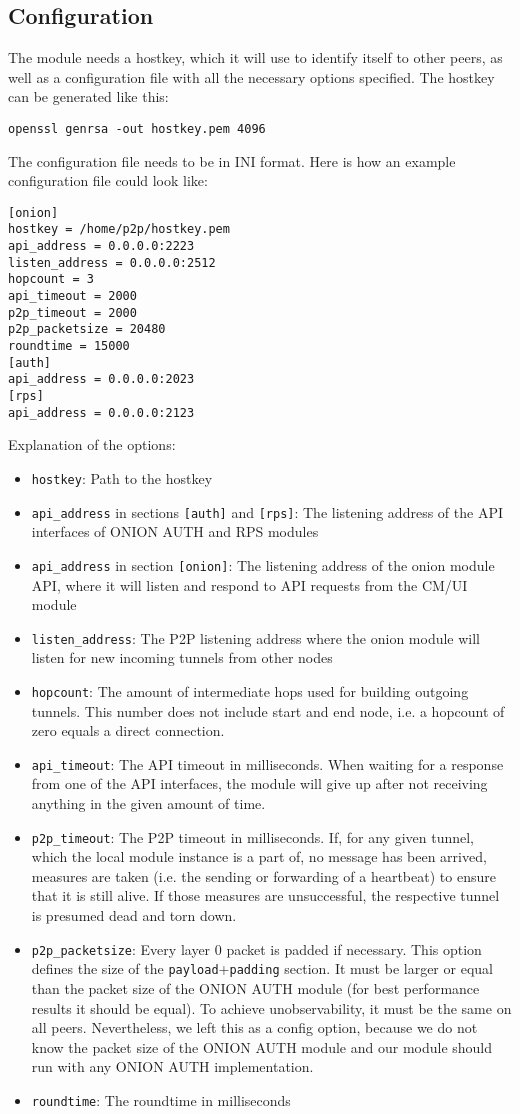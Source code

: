 \documentclass{article}
\begin{document}
\subsection{Configuration}
The module needs a hostkey, which it will use to identify itself to other peers, as well as a configuration file with all the necessary options specified. The hostkey can be generated like this:
\begin{lstlisting}
openssl genrsa -out hostkey.pem 4096
\end{lstlisting} 
The configuration file needs to be in INI format. Here is how an example configuration file could look like:
\begin{lstlisting}
[onion]
hostkey = /home/p2p/hostkey.pem
api_address = 0.0.0.0:2223
listen_address = 0.0.0.0:2512
hopcount = 3
api_timeout = 2000
p2p_timeout = 2000
p2p_packetsize = 20480
roundtime = 15000
[auth]
api_address = 0.0.0.0:2023
[rps]
api_address = 0.0.0.0:2123
\end{lstlisting}
Explanation of the options:
\begin{itemize}
\item \texttt{hostkey}: Path to the hostkey
\item \texttt{api\_address} in sections \texttt{[auth]} and \texttt{[rps]}: The listening address of the API interfaces of ONION AUTH and RPS modules
\item \texttt{api\_address} in section \texttt{[onion]}: The listening address of the onion module API, where it will listen and respond to API requests from the CM/UI module
\item \texttt{listen\_address}: The P2P listening address where the onion module will listen for new incoming tunnels from other nodes
\item \texttt{hopcount}: The amount of intermediate hops used for building outgoing tunnels. This number does not include start and end node, i.e. a hopcount of zero equals a direct connection.
\item \texttt{api\_timeout}: The API timeout in milliseconds. When waiting for a response from one of the API interfaces, the module will give up after not receiving anything in the given amount of time.
\item \texttt{p2p\_timeout}: The P2P timeout in milliseconds. If, for any given tunnel, which the local module instance is a part of, no message has been arrived, measures are taken (i.e. the sending or forwarding of a heartbeat) to ensure that it is still alive. If those measures are unsuccessful, the respective tunnel is presumed dead and torn down.
\item \texttt{p2p\_packetsize}: Every layer 0 packet is padded if necessary. This option defines the size of the \texttt{payload}+\texttt{padding} section. It must be larger or equal than the packet size of the ONION AUTH module (for best performance results it should be equal). To achieve unobservability, it must be the same on all peers. Nevertheless, we left this as a config option, because we do not know the packet size of the ONION AUTH module and our module should run with any ONION AUTH implementation.
\item \texttt{roundtime}: The roundtime in milliseconds
\end{itemize}
\end{document}
